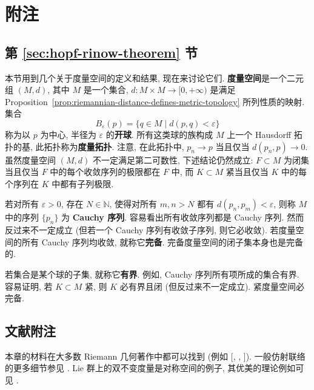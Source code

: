 \section{附注}\label{sec:notes-on-riemannian-manifolds}

\subsection{第 \ref{sec:hopf-rinow-theorem} 节}\label{subsec:notes-hopf-rinow}

本节用到几个关于度量空间的定义和结果, 现在来讨论它们. \textbf{度量空间}是一个二元组 $(M,d)$, 其中 $M$ 是一个集合, $d:M\times M\to[0,+\infty)$ 是满足 Proposition~\ref{prop:riemannian-distance-defines-metric-topology} 所列性质的映射. 集合
\[
  B_\varepsilon(p)=\{q\in M\mid d(p,q)<\varepsilon\}
\]
称为以 $p$ 为中心, 半径为 $\varepsilon$ 的\textbf{开球}. 所有这类球的族构成 $M$ 上一个 Hausdorff 拓扑的基, 此拓扑称为\textbf{度量拓扑}. 注意, 在此拓扑中, $p_n\to p$ 当且仅当 $d(p_n,p)\to0$. 虽然度量空间 $(M,d)$ 不一定满足第二可数性, 下述结论仍然成立: $F\subset M$ 为闭集当且仅当 $F$ 中的每个收敛序列的极限都在 $F$ 中, 而 $K\subset M$ 紧当且仅当 $K$ 中的每个序列在 $K$ 中都有子列极限.

若对所有 $\varepsilon>0$, 存在 $N\in\mathbb{N}$, 使得对所有 $m,n>N$ 都有 $d(p_n,p_m)<\varepsilon$, 则称 $M$ 中的序列 $\{p_n\}$ 为 \textbf{Cauchy 序列}. 容易看出所有收敛序列都是 Cauchy 序列. 然而反过来不一定成立 (但若一个 Cauchy 序列有收敛子序列, 则它必收敛). 若度量空间的所有 Cauchy 序列均收敛, 就称它\textbf{完备}. 完备度量空间的闭子集本身也是完备的.

若集合是某个球的子集, 就称它\textbf{有界}. 例如, Cauchy 序列所有项所成的集合有界. 容易证明, 若 $K\subset M$ 紧, 则 $K$ 必有界且闭 (但反过来不一定成立). 紧度量空间必完备.

\subsection{文献附注}\label{subsec:riemannian-manifolds-literature}

本章的材料在大多数 Riemann 几何著作中都可以找到 (例如 [, , ]). 一般仿射联络的更多细节参见 . Lie 群上的双不变度量是对称空间的例子, 其优美的理论例如可见 .
